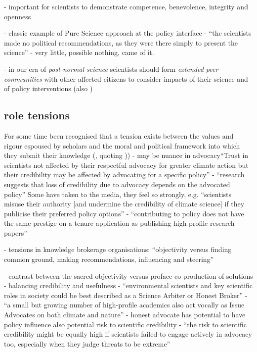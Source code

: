 \cite{ColognaKMBMO2024} - important for scientists to demonstrate competence, benevolence, integrity and openness

\cite{Horton2022} - classic example of Pure Science approach at the policy interface - ``the scientists made no political recommendations, as they were there simply to present the science'' - very little, possible nothing, came of it.

\cite{FuntowiczR1993,Jasanoff2003} - in our era of \emph{post-normal science} scientists should form \emph{extended peer communities} with other affected citizens to consider impacts of their science and of policy interventions (also \cite{KalafatisL2019})

\subsection{role tensions}
For some time been recognised that a tension exists between the values and rigour espoused by scholars and the moral and political framework into which they submit their knowledge (\cite{Nau2009}, quoting \cite[p263]{Bull1972} ))
\cite{ColognaKMBMO2024} - may be nuance in advocacy``Trust in scientists not affected by their respectful advocacy for greater climate action but their credibility may be affected by advocating for a specific policy''
\cite{DablanderSCSBGGBAH2024} - ``research suggests that loss of credibility due to advocacy depends on the advocated policy''
Some have taken to the media, they feel so strongly, e.g. ``scientists misuse their authority [and undermine the credibility of climate science] if they publicise their preferred policy options'' \cite{Edwards2013}
\cite{Gerber2023} - ``contributing to policy does not have the same prestige on a tenure application as publishing high-profile research papers''

\cite{MacKillopCDD2023} - tensions in knowledge brokerage organisations: ``objectivity versus finding common ground, making recommendations, influencing and steering''

\cite{WesselinkH2020} - contrast between the sacred objectivity versus proface co-production of solutions - balancing credibility and usefulness
\cite{GregoryBW2024} - ``environmental scientists and key scientific roles in society could be best described as a Science Arbiter or Honest Broker''
\cite{GregoryBW2024} - ``a small but growing number of high-profile academics also act vocally as Issue Advocates on both climate and nature''
\cite{GregoryBW2024} - honest advocate has potential to have policy influence also potential risk to scientific credibility
\cite{GregoryBW2024} - ``the risk to scientific credibility might be equally high if scientists failed to engage actively in advocacy too, especially when they judge threats to be extreme''

